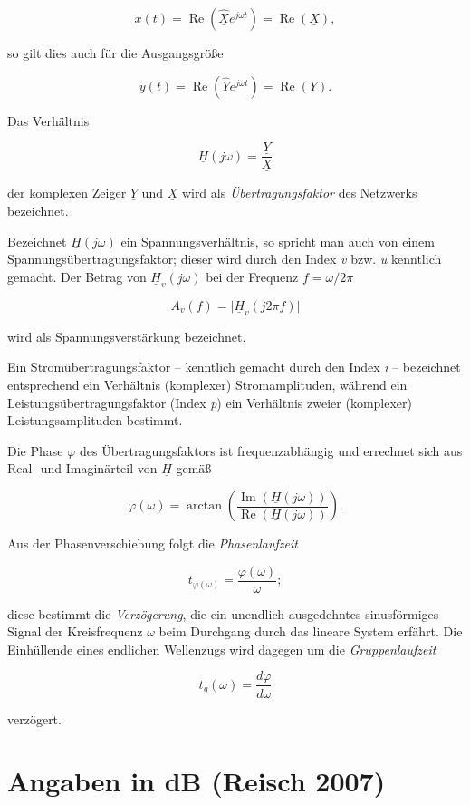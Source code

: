 \documentclass[
  ngerman,
  letterpaper,
]{scrbook}
\begin{document}
\[
x(t) = \operatorname{Re}(\underline{\hat{X}} e^{j\omega t}) = \operatorname{Re}(\underline{X}),
\]

so gilt dies auch für die Ausgangsgröße

\[
y(t) = \operatorname{Re}(\underline{\hat{Y}} e^{j \omega t}) = \operatorname{Re}(\underline{Y}).
\]

Das Verhältnis

\[
\underline{H}(j\omega) = \frac{\underline{Y}}{\underline{X}}
\]

der komplexen Zeiger \(\underline{Y}\) und \(\underline{X}\) wird als
\emph{Übertragungsfaktor} des Netzwerks bezeichnet.

Bezeichnet \(\underline{H}(j\omega)\) ein Spannungsverhältnis, so
spricht man auch von einem Spannungsübertragungsfaktor; dieser wird
durch den Index \emph{v} bzw. \emph{u} kenntlich gemacht. Der Betrag von
\(\underline{H}_v(j \omega)\) bei der Frequenz \(f = \omega/2 \pi\)

\[
A_v(f) = \vert \underline{H}_v(j2 \pi f) \vert
\]

wird als Spannungsverstärkung bezeichnet.

Ein Stromübertragungsfaktor -- kenntlich gemacht durch den Index
\emph{i} -- bezeichnet entsprechend ein Verhältnis (komplexer)
Stromamplituden, während ein Leistungsübertragungsfaktor (Index
\emph{p}) ein Verhältnis zweier (komplexer) Leistungsamplituden
bestimmt.

Die Phase \(\varphi\) des Übertragungsfaktors ist frequenzabhängig und
errechnet sich aus Real- und Imaginärteil von \(\underline{H}\) gemäß

\[
\varphi(\omega) = \arctan\left( \frac{\operatorname{Im}(\underline{H}(j \omega))}{\operatorname{Re}(\underline{H}(j \omega))} \right).
\]

Aus der Phasenverschiebung folgt die \emph{Phasenlaufzeit}

\[
t_{\varphi(\omega)} = \frac{\varphi(\omega)}{\omega}; 
\]

diese bestimmt die \emph{Verzögerung}, die ein unendlich ausgedehntes
sinusförmiges Signal der Kreisfrequenz \(\omega\) beim Durchgang durch
das lineare System erfährt. Die Einhüllende eines endlichen Wellenzugs
wird dagegen um die \emph{Gruppenlaufzeit}

\[
t_g(\omega) = \frac{d\varphi}{d\omega}
\]

verzögert.

\section{Angaben in dB (Reisch 2007)}\label{angaben-in-db-reisch2007}
\end{document}
